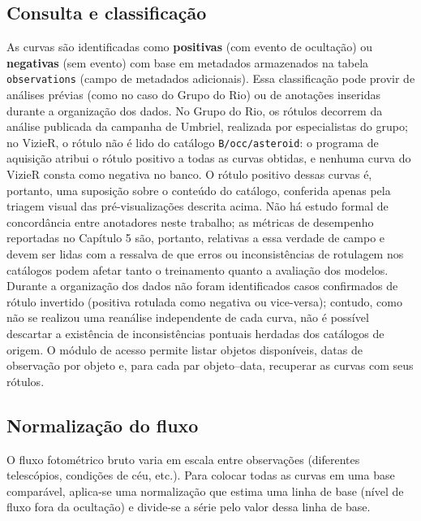 \subsection{Consulta e classificação}

As curvas são identificadas como \textbf{positivas} (com evento de ocultação) ou \textbf{negativas} (sem evento) com base em metadados armazenados na tabela \texttt{observations} (campo de metadados adicionais). Essa classificação pode provir de análises prévias (como no caso do Grupo do Rio) ou de anotações inseridas durante a organização dos dados. No Grupo do Rio, os rótulos decorrem da análise publicada da campanha de Umbriel, realizada por especialistas do grupo; no VizieR, o rótulo não é lido do catálogo \texttt{B/occ/asteroid}: o programa de aquisição atribui o rótulo positivo a todas as curvas obtidas, e nenhuma curva do VizieR consta como negativa no banco. O rótulo positivo dessas curvas é, portanto, uma suposição sobre o conteúdo do catálogo, conferida apenas pela triagem visual das pré-visualizações descrita acima. Não há estudo formal de concordância entre anotadores neste trabalho; as métricas de desempenho reportadas no Capítulo 5 são, portanto, relativas a essa verdade de campo e devem ser lidas com a ressalva de que erros ou inconsistências de rotulagem nos catálogos podem afetar tanto o treinamento quanto a avaliação dos modelos. Durante a organização dos dados não foram identificados casos confirmados de rótulo invertido (positiva rotulada como negativa ou vice-versa); contudo, como não se realizou uma reanálise independente de cada curva, não é possível descartar a existência de inconsistências pontuais herdadas dos catálogos de origem. O módulo de acesso permite listar objetos disponíveis, datas de observação por objeto e, para cada par objeto--data, recuperar as curvas com seus rótulos.

\subsection{Normalização do fluxo}

O fluxo fotométrico bruto varia em escala entre observações (diferentes telescópios, condições de céu, etc.). Para colocar todas as curvas em uma base comparável, aplica-se uma normalização que estima uma linha de base (nível de fluxo fora da ocultação) e divide-se a série pelo valor dessa linha de base.

